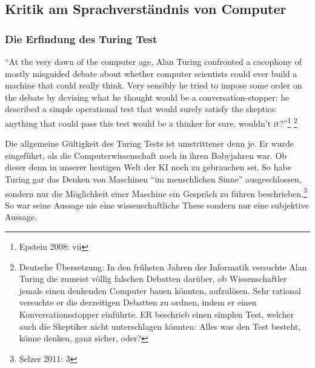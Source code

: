 \documentclass[a4paper,10pt]{article}
\begin{document}
\subsection{Kritik am Sprachverständnis von Computer}
\subsubsection{Die Erfindung des Turing Test}
\begin{displayquote}
\enquote{At the very dawn of the computer age, Alan Turing confronted a cacophony of
mostly misguided debate about whether computer scientists could ever build a
machine that could really think. Very sensibly he tried to impose some order on the
debate by devising what he thought would be a conversation-stopper: he described
a simple operational test that would surely satisfy the skeptics: anything that could
pass this test would be a thinker for sure, wouldn’t it?}\footnote{Epstein 2008: vii} \footnote{Deutsche Übersetzung: In den frühsten Jahren der Informatik versuchte Alan Turing die zumeist völlig falschen Debatten darüber, ob Wissenschaftler jemals einen denkenden Computer bauen könnten, aufzulösen. Sehr rational versuchte er die derzeitigen Debatten zu ordnen, indem er einen Konversationsstopper einführte. ER beschrieb einen simplen Test, welcher auch die Skeptiker nicht unterschlagen könnten: Alles was den Test besteht, könne denken, ganz sicher, oder?}
\end{displayquote}
Die allgemeine Gültigkeit des Turing Tests ist umstrittener denn  je. Er wurde eingeführt, als die Computerwissenschaft noch in ihren Babyjahren war. Ob dieser denn in unserer heutigen Welt der KI noch zu gebrauchen sei. So habe Turing gar das Denken von Maschinen \enquote{im menschlichen Sinne} ausgeschlossen, sondern nur die Möglichkeit einer Maschine ein Gespräch zu führen beschrieben.\footnote{Selzer 2011: 3} \\
So war seine Aussage nie eine wissenschaftliche These sondern nur eine subjektive Aussage.
\end{document}
